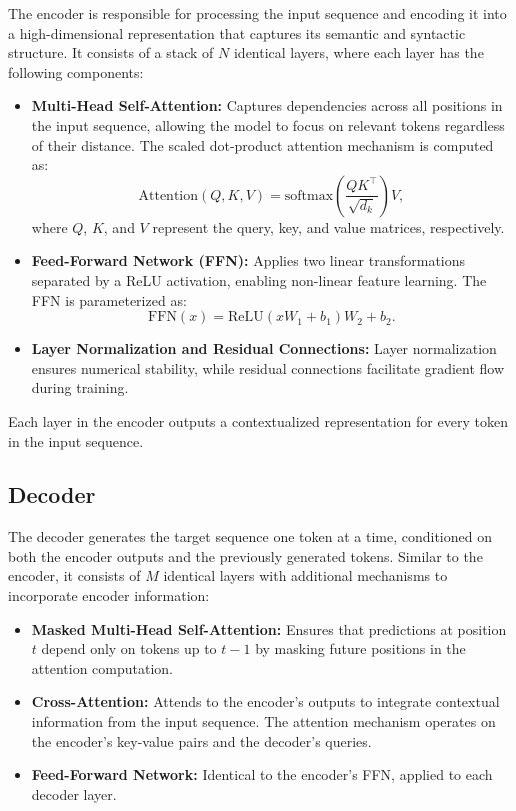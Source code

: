 \documentclass{article}
\begin{document}
The encoder is responsible for processing the input sequence and encoding it into a high-dimensional representation that captures its semantic and syntactic structure. It consists of a stack of $N$ identical layers, where each layer has the following components:
\begin{itemize}
    \item \textbf{Multi-Head Self-Attention:} Captures dependencies across all positions in the input sequence, allowing the model to focus on relevant tokens regardless of their distance. The scaled dot-product attention mechanism is computed as:
    \[
    \text{Attention}(Q, K, V) = \text{softmax}\left(\frac{QK^\top}{\sqrt{d_k}}\right)V,
    \]
    where $Q$, $K$, and $V$ represent the query, key, and value matrices, respectively.
    \item \textbf{Feed-Forward Network (FFN):} Applies two linear transformations separated by a ReLU activation, enabling non-linear feature learning. The FFN is parameterized as:
    \[
    \text{FFN}(x) = \text{ReLU}(xW_1 + b_1)W_2 + b_2.
    \]
    \item \textbf{Layer Normalization and Residual Connections:} Layer normalization ensures numerical stability, while residual connections facilitate gradient flow during training.
\end{itemize}

Each layer in the encoder outputs a contextualized representation for every token in the input sequence.

\subsection{Decoder}

The decoder generates the target sequence one token at a time, conditioned on both the encoder outputs and the previously generated tokens. Similar to the encoder, it consists of $M$ identical layers with additional mechanisms to incorporate encoder information:
\begin{itemize}
    \item \textbf{Masked Multi-Head Self-Attention:} Ensures that predictions at position $t$ depend only on tokens up to $t-1$ by masking future positions in the attention computation.
    \item \textbf{Cross-Attention:} Attends to the encoder's outputs to integrate contextual information from the input sequence. The attention mechanism operates on the encoder's key-value pairs and the decoder's queries.
    \item \textbf{Feed-Forward Network:} Identical to the encoder's FFN, applied to each decoder layer.
\end{itemize}
\end{document}
